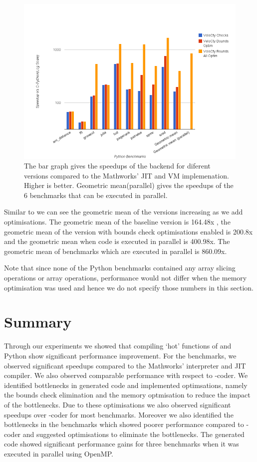 \begin{figure}[htbp]
\centering
\includegraphics[scale=0.5]{Figures/final_py.png}
\caption[Summary of Python Results]{The bar graph gives the speedups of the \velocty backend for diferent \velocty versions compared to the Mathworks' JIT and VM implemenation. Higher is better. Geometric mean(parallel) gives the speedups of the 6 benchmarks that can be executed in parallel. }
\label{fig:results_final}
\end{figure}

Similar to \matlab we can see the geometric mean of the \velocty versions increasing as we add optimisations. The geometric mean of the baseline \velocty version is 164.48x , the geometric mean of the version with bounds check optimisations enabled is 200.8x and the geometric mean when \velocty code is executed in parallel is 400.98x. The geometric mean of benchmarks which are executed in parallel is 860.09x.

Note that since none of the Python benchmarks contained any array slicing operations or array operations, performance would not differ when the memory optimisation was used and hence we do not specify those numbers in this section. 
\section{Summary}
Through our experiments we showed that compiling `hot' functions of \matlab and Python show significant performance improvement. 
For the \matlab benchmarks, we observed significant  speedups compared to the Mathworks' \matlab interpreter and JIT compiler. We also observed comparable performance with respect to \matlab-coder. We identified bottlenecks in generated code and implemented optimsations, namely the bounds check elimination and the memory optmisation to reduce the impact of the bottlenecks. Due to these optimisations we also observed significant speedups over \matlab-coder for most benchmarks. Moreover we also identified the bottlenecks in the benchmarks which showed poorer performance compared to \matlab-coder and suggested optimisations to eliminate the bottlenecks. The generated code showed significant performance gains for three benchmarks when it was executed in parallel using OpenMP.


